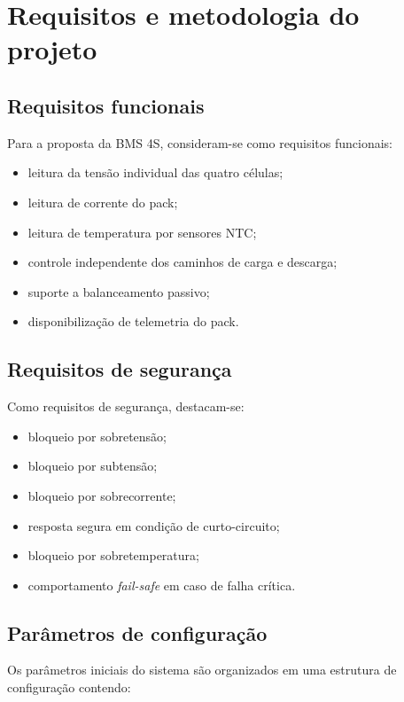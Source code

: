 \chapter{Requisitos e metodologia do projeto}

\section{Requisitos funcionais}

Para a proposta da BMS 4S, consideram-se como requisitos funcionais:

\begin{itemize}
  \item leitura da tensão individual das quatro células;
  \item leitura de corrente do pack;
  \item leitura de temperatura por sensores NTC;
  \item controle independente dos caminhos de carga e descarga;
  \item suporte a balanceamento passivo;
  \item disponibilização de telemetria do pack.
\end{itemize}

\section{Requisitos de segurança}

Como requisitos de segurança, destacam-se:

\begin{itemize}
  \item bloqueio por sobretensão;
  \item bloqueio por subtensão;
  \item bloqueio por sobrecorrente;
  \item resposta segura em condição de curto-circuito;
  \item bloqueio por sobretemperatura;
  \item comportamento \textit{fail-safe} em caso de falha crítica.
\end{itemize}

\section{Parâmetros de configuração}

Os parâmetros iniciais do sistema são organizados em uma estrutura de configuração contendo:

